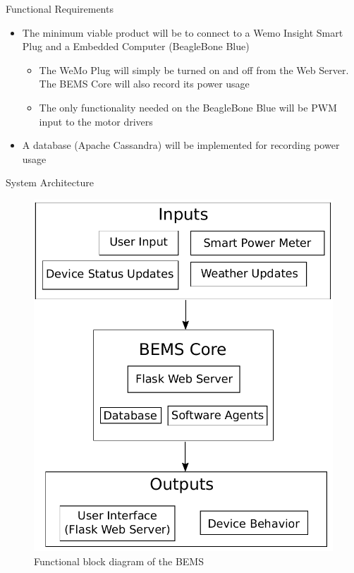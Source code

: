 \documentclass{beamer}
\begin{document}
\begin{frame}{Functional Requirements}{}
    \begin{itemize}
        \item The minimum viable product will be to connect to a Wemo Insight Smart Plug and a Embedded Computer (BeagleBone Blue)
        \begin{itemize}
            \item The WeMo Plug will simply be turned on and off from the Web Server. The BEMS Core will also record its power usage
            \item The only functionality needed on the BeagleBone Blue will be PWM input to the motor drivers
        \end{itemize}
        \item A database (Apache Cassandra) will be implemented for recording power usage
    \end{itemize}
\end{frame}

\begin{frame}{System Architecture}{}
    \begin{figure}
        \centering
        \includegraphics[scale=0.4]{figs/functionalBlockDiagram.pdf}
        \caption{Functional block diagram of the BEMS}
        \label{fig:my_label}
    \end{figure}
\end{frame}
\end{document}

